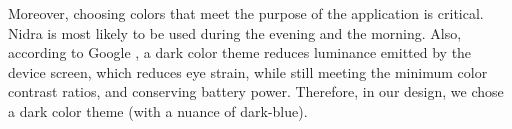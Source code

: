 Moreover, choosing colors that meet the purpose of the application is critical. Nidra is most likely to be used during the evening and the morning. Also, according to Google \cite{darktheme}, a dark color theme reduces luminance emitted by the device screen, which reduces eye strain, while still meeting the minimum color contrast ratios, and conserving battery power. Therefore, in our design, we chose a dark color theme (with a nuance of dark-blue). 